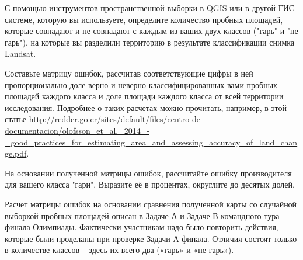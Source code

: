 
С помощью инструментов пространственной выборки в QGIS или в другой ГИС-системе, которую вы используете, определите количество пробных площадей, которые совпадают и не совпадают с каждым из ваших двух классов ("гарь" и "не гарь"), на которые вы разделили территорию в результате классификации снимка Landsat.

Составьте матрицу ошибок, рассчитав соответствующие цифры в ней пропорционально доле верно и неверно классифицированных вами пробных площадей каждого класса и доле площади каждого класса от всей территории исследования. Подробнее о таких расчетах можно прочитать, например, в этой статье \url{http://reddcr.go.cr/sites/default/files/centro-de-documentacion/olofsson_et_al._2014_-_good}\linebreak \url{_practices_for_estimating_area_and_assessing_accuracy_of_land_change.pdf}.

На основании полученной матрицы ошибок, рассчитайте ошибку производителя для вашего класса "гари". Выразите её в процентах, округлите до десятых долей.

\explanationSection

Расчет матрицы ошибок на основании сравнения полученной карты со случайной выборкой пробных площадей описан в Задаче А и Задаче В командного тура финала Олимпиады. Фактически участникам надо было повторить действия, которые были проделаны при проверке Задачи А финала. Отличия состоят только в количестве классов – здесь их всего два («гарь» и «не гарь»).

